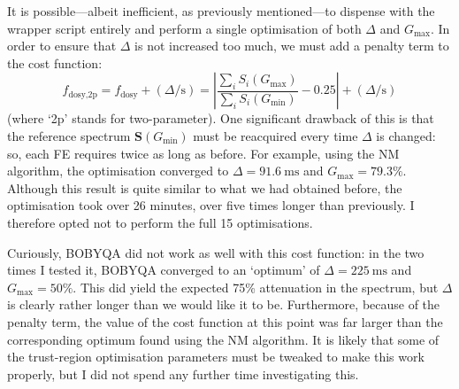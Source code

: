 It is possible---albeit inefficient, as previously mentioned---to dispense with the wrapper script entirely and perform a single optimisation of both $\Delta$ and $G_\text{max}$.
In order to ensure that $\Delta$ is not increased too much, we must add a penalty term to the cost function:
\begin{equation}
    \label{eq:dosy_2p_cf}
    f_\text{dosy,2p} = f_\text{dosy} + (\Delta / \unit{\s}) = \left| \frac{\sum_i S_i(G_\text{max})}{\sum_i S_i(G_\text{min})} - 0.25 \right| + (\Delta / \unit{\s})
\end{equation}
(where `2p' stands for two-parameter).
One significant drawback of this is that the reference spectrum $\symbf{S}(G_\text{min})$ must be reacquired every time $\Delta$ is changed: so, each FE requires twice as long as before.
For example, using the NM algorithm, the optimisation converged to $\Delta = \qty{91.6}{\ms}$ and $G_\text{max} = 79.3\%$.
Although this result is quite similar to what we had obtained before, the optimisation took over 26 minutes, over five times longer than previously.
I therefore opted not to perform the full 15 optimisations.

Curiously, BOBYQA did not work as well with this cost function: in the two times I tested it, BOBYQA converged to an `optimum' of $\Delta = \qty{225}{\ms}$ and $G_\text{max} = 50\%$.
This did yield the expected 75\% attenuation in the spectrum, but $\Delta$ is clearly rather longer than we would like it to be.
Furthermore, because of the penalty term, the value of the cost function at this point was far larger than the corresponding optimum found using the NM algorithm.
It is likely that some of the trust-region optimisation parameters must be tweaked to make this work properly, but I did not spend any further time investigating this.
